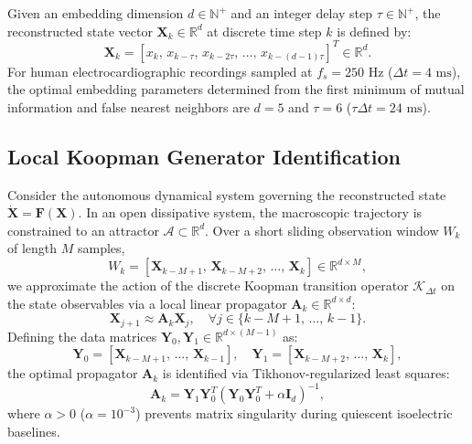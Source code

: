 \documentclass[11pt,a4paper]{article}
\begin{document}
Given an embedding dimension $d \in \mathbb{N}^+$ and an integer delay step $\tau \in \mathbb{N}^+$, the reconstructed state vector $\bm{X}_k \in \mathbb{R}^d$ at discrete time step $k$ is defined by:
\begin{equation}
\bm{X}_k = \left[ x_k, \, x_{k - \tau}, \, x_{k - 2\tau}, \, \dots, \, x_{k - (d-1)\tau} \right]^T \in \mathbb{R}^d.
\end{equation}
For human electrocardiographic recordings sampled at $f_s = 250\text{ Hz}$ ($\Delta t = 4\text{ ms}$), the optimal embedding parameters determined from the first minimum of mutual information and false nearest neighbors are $d = 5$ and $\tau = 6$ ($\tau \Delta t = 24\text{ ms}$).

\subsection{Local Koopman Generator Identification}

Consider the autonomous dynamical system governing the reconstructed state $\dot{\bm{X}} = \bm{F}(\bm{X})$. In an open dissipative system, the macroscopic trajectory is constrained to an attractor $\mathcal{A} \subset \mathbb{R}^d$. Over a short sliding observation window $W_k$ of length $M$ samples,
\begin{equation}
W_k = \left[ \bm{X}_{k - M + 1}, \, \bm{X}_{k - M + 2}, \, \dots, \, \bm{X}_k \right] \in \mathbb{R}^{d \times M},
\end{equation}
we approximate the action of the discrete Koopman transition operator $\mathcal{K}_{\Delta t}$ on the state observables via a local linear propagator $\bm{A}_k \in \mathbb{R}^{d \times d}$:
\begin{equation}
\bm{X}_{j+1} \approx \bm{A}_k \bm{X}_j, \quad \forall j \in \{k - M + 1, \, \dots, \, k - 1\}.
\end{equation}
Defining the data matrices $\bm{Y}_0, \bm{Y}_1 \in \mathbb{R}^{d \times (M-1)}$ as:
\begin{equation}
\bm{Y}_0 = \left[ \bm{X}_{k - M + 1}, \, \dots, \, \bm{X}_{k - 1} \right], \quad \bm{Y}_1 = \left[ \bm{X}_{k - M + 2}, \, \dots, \, \bm{X}_k \right],
\end{equation}
the optimal propagator $\bm{A}_k$ is identified via Tikhonov-regularized least squares:
\begin{equation}
\bm{A}_k = \bm{Y}_1 \bm{Y}_0^T \left( \bm{Y}_0 \bm{Y}_0^T + \alpha \bm{I}_d \right)^{-1},
\end{equation}
where $\alpha > 0$ ($\alpha = 10^{-3}$) prevents matrix singularity during quiescent isoelectric baselines.
\end{document}
